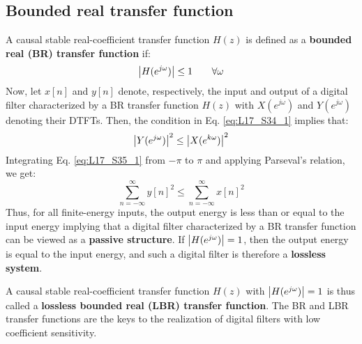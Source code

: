 \documentclass[../../main/main.tex]{subfiles}
\begin{document}
\subsection{Bounded real transfer function}
A causal stable real-coefficient transfer function \( H(z) \) is defined as a \textbf{bounded real (BR) transfer function} if:
\begin{equation}
    \abs{H(e^{j\omega})}
    \le
    1
    \qquad
    \forall \omega
    \label{eq:L17_S34_1}
\end{equation}
Now, let \( x[n] \) and \( y[n] \) denote, respectively, the input and output of a digital filter characterized by a BR transfer function \( H(z) \) with \( X(e^{j\omega}) \) and \( Y(e^{j\omega}) \) denoting their DTFTs. Then, the condition in Eq. \ref{eq:L17_S34_1} implies that:
\begin{equation}
    \abs{Y(e^{j\omega})}^2
    \le
    \abs{X(e^{k\omega})}^2
    \label{eq:L17_S35_1}
\end{equation}
Integrating Eq. \ref{eq:L17_S35_1} from \( - \pi \) to \( \pi \) and applying Parseval's relation, we get:
\begin{equation}
    \sum_{n=-\infty}^{\infty} y[n]^2
    \le
    \sum_{n=-\infty}^{\infty} x[n]^2
    \label{eq:L17_S35_2}
\end{equation}
Thus, for all finite-energy inputs, the output energy is less than or equal to the input energy implying that a digital filter characterized by a BR transfer function can be viewed as a \textbf{passive structure}.
If \( \abs{H(e^{j\omega})} = 1 \), then the output energy is equal to the input energy, and such a digital filter is therefore a \textbf{lossless system}.

A causal stable real-coefficient transfer function \( H(z) \) with \( \abs{H(e^{j\omega})} = 1 \) is thus called a \textbf{lossless bounded real (LBR) transfer function}.
The BR and LBR transfer functions are the keys to the realization of digital filters with low coefficient sensitivity.
\end{document}
